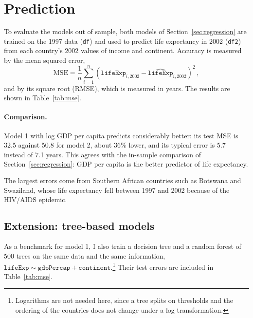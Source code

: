 \documentclass[a4paper,12pt]{article}
\begin{document}
\section{Prediction}
\label{sec:prediction}

To evaluate the models out of sample, both models of Section~\ref{sec:regression} are trained on the 1997 data (\texttt{df}) and used to predict life expectancy in 2002 (\texttt{df2}) from each country's 2002 values of income and continent. Accuracy is measured by the mean squared error,
\begin{equation}
    \text{MSE} = \frac{1}{n} \sum_{i=1}^{n} \left( \texttt{lifeExp}_{i,2002} - \widehat{\texttt{lifeExp}}_{i,2002} \right)^2 \, ,
    \label{eq:mse}
\end{equation}
and by its square root (RMSE), which is measured in years. The results are shown in Table~\ref{tab:mse}.



\paragraph{Comparison.} Model 1 with log GDP per capita predicts considerably better: its test MSE is 32.5 against 50.8 for model 2, about 36\% lower, and its typical error is 5.7 instead of 7.1 years. This agrees with the in-sample comparison of Section~\ref{sec:regression}: GDP per capita is the better predictor of life expectancy.

The largest errors come from Southern African countries such as Botswana and Swaziland, whose life expectancy fell between 1997 and 2002 because of the HIV/AIDS epidemic.

\subsection{Extension: tree-based models}
\label{sec:trees}

As a benchmark for model 1, I also train a decision tree \citep{therneau2025rpart} and a random forest of 500 trees \citep{liaw2002randomforest} on the same data and the same information, $\texttt{lifeExp} \sim \texttt{gdpPercap} + \texttt{continent}$.\footnote{
    Logarithms are not needed here, since a tree splits on thresholds and the ordering of the countries does not change under a log transformation.
}
Their test errors are included in Table~\ref{tab:mse}.
\end{document}

